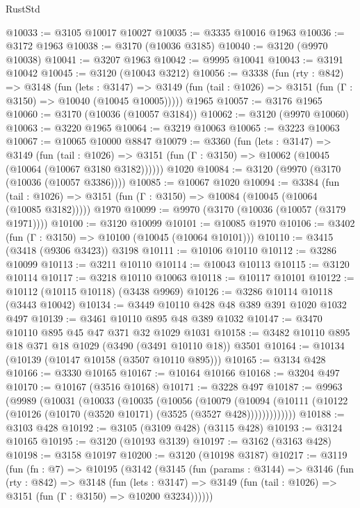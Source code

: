 \begin{lexlean}{RustStd}
\begin{coremodule}
{\begin{coremodule}
{{{{{{{{{{{{{{{{{{{{{{{{{{@10033 := @3105 @10017 @10027
@10035 := @3335 @10016 @1963
@10036 := @3172 @1963
@10038 := @3170 (@10036 @3185)
@10040 := @3120 (@9970 @10038)
@10041 := @3207 @1963
@10042 := @9995 @10041
@10043 := @3191 @10042
@10045 := @3120 (@10043 @3212)
@10056 := @3338
    (fun (rty : @842) =>
    @3148
      (fun (lets : @3147) =>
      @3149 (fun (tail : @1026) => @3151 (fun (Γ : @3150) => @10040 (@10045 @10005)))))
    @1965
@10057 := @3176 @1965
@10060 := @3170 (@10036 (@10057 @3184))
@10062 := @3120 (@9970 @10060)
@10063 := @3220 @1965
@10064 := @3219 @10063
@10065 := @3223 @10063
@10067 := @10065 @10000 @8847
@10079 := @3360
    (fun (lets : @3147) =>
    @3149
      (fun (tail : @1026) =>
      @3151 (fun (Γ : @3150) => @10062 (@10045 (@10064 (@10067 @3180 @3182))))))
    @1020
@10084 := @3120 (@9970 (@3170 (@10036 (@10057 @3386))))
@10085 := @10067 @1020
@10094 := @3384
    (fun (tail : @1026) => @3151 (fun (Γ : @3150) => @10084 (@10045 (@10064 (@10085 @3182)))))
    @1970
@10099 := @9970 (@3170 (@10036 (@10057 (@3179 @1971))))
@10100 := @3120 @10099
@10101 := @10085 @1970
@10106 := @3402 (fun (Γ : @3150) => @10100 (@10045 (@10064 @10101)))
@10110 := @3415 (@3418 (@9306 @3423)) @3198
@10111 := @10106 @10110
@10112 := @3286 @10099
@10113 := @3211 @10110
@10114 := @10043 @10113
@10115 := @3120 @10114
@10117 := @3218 @10110 @10063
@10118 := @10117 @10101
@10122 := @10112 (@10115 @10118) (@3438 @9969)
@10126 := @3286 @10114 @10118 (@3443 @10042)
@10134 := @3449 @10110 @428 @48 @389 @391 @1020 @1032 @497
@10139 := @3461 @10110 @895 @48 @389 @1032
@10147 := @3470 @10110 @895 @45 @47 @371 @32 @1029 @1031
@10158 := @3482 @10110 @895 @18 @371 @18 @1029 (@3490 (@3491 @10110 @18)) @3501
@10164 := @10134 (@10139 (@10147 @10158 (@3507 @10110 @895)))
@10165 := @3134 @428
@10166 := @3330 @10165
@10167 := @10164 @10166
@10168 := @3204 @497
@10170 := @10167 (@3516 @10168)
@10171 := @3228 @497
@10187 := @9963
    (@9989
      (@10031
        (@10033
          (@10035
            (@10056
              (@10079
                (@10094
                  (@10111 (@10122 (@10126 (@10170 (@3520 @10171) (@3525 (@3527 @428)))))))))))))
@10188 := @3103 @428
@10192 := @3105 (@3109 @428) (@3115 @428)
@10193 := @3124 @10165
@10195 := @3120 (@10193 @3139)
@10197 := @3162 (@3163 @428)
@10198 := @3158 @10197
@10200 := @3120 (@10198 @3187)
@10217 := @3119
    (fun (fn : @7) =>
    @10195
      (@3142
        (@3145
          (fun (params : @3144) =>
          @3146
            (fun (rty : @842) =>
            @3148
              (fun (lets : @3147) =>
              @3149 (fun (tail : @1026) => @3151 (fun (Γ : @3150) => @10200 @3234))))))
}}}}}}}}}}}}}}}}}}}}}}}}}}
\end{coremodule}}
\end{coremodule}
\end{lexlean}
